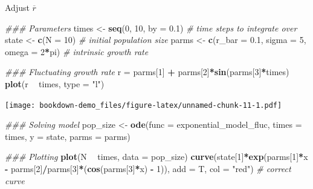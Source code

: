 \documentclass[
]{book}
\newenvironment{Shaded}{\begin{snugshade}}{\end{snugshade}}
\newcommand{\CommentTok}[1]{\textcolor[rgb]{0.56,0.35,0.01}{\textit{#1}}}
\newcommand{\DataTypeTok}[1]{\textcolor[rgb]{0.13,0.29,0.53}{#1}}
\newcommand{\DecValTok}[1]{\textcolor[rgb]{0.00,0.00,0.81}{#1}}
\newcommand{\FloatTok}[1]{\textcolor[rgb]{0.00,0.00,0.81}{#1}}
\newcommand{\KeywordTok}[1]{\textcolor[rgb]{0.13,0.29,0.53}{\textbf{#1}}}
\newcommand{\NormalTok}[1]{#1}
\newcommand{\OperatorTok}[1]{\textcolor[rgb]{0.81,0.36,0.00}{\textbf{#1}}}
\newcommand{\StringTok}[1]{\textcolor[rgb]{0.31,0.60,0.02}{#1}}
\begin{document}
Adjust \(\overline{r}\)

\begin{Shaded}
\begin{Highlighting}[]
\CommentTok{### Parameters}
\NormalTok{times <-}\StringTok{ }\KeywordTok{seq}\NormalTok{(}\DecValTok{0}\NormalTok{, }\DecValTok{10}\NormalTok{, }\DataTypeTok{by =} \FloatTok{0.1}\NormalTok{)  }\CommentTok{# time steps to integrate over}
\NormalTok{state <-}\StringTok{ }\KeywordTok{c}\NormalTok{(}\DataTypeTok{N =} \DecValTok{10}\NormalTok{)  }\CommentTok{# initial population size}
\NormalTok{parms <-}\StringTok{ }\KeywordTok{c}\NormalTok{(}\DataTypeTok{r_bar =} \FloatTok{0.1}\NormalTok{, }\DataTypeTok{sigma =} \DecValTok{5}\NormalTok{, }\DataTypeTok{omega =} \DecValTok{2}\OperatorTok{*}\NormalTok{pi)  }\CommentTok{# intrinsic growth rate}

\CommentTok{### Fluctuating growth rate}
\NormalTok{r =}\StringTok{ }\NormalTok{parms[}\DecValTok{1}\NormalTok{] }\OperatorTok{+}\StringTok{ }\NormalTok{parms[}\DecValTok{2}\NormalTok{]}\OperatorTok{*}\KeywordTok{sin}\NormalTok{(parms[}\DecValTok{3}\NormalTok{]}\OperatorTok{*}\NormalTok{times)}
\KeywordTok{plot}\NormalTok{(r }\OperatorTok{~}\StringTok{ }\NormalTok{times, }\DataTypeTok{type =} \StringTok{"l"}\NormalTok{)}
\end{Highlighting}
\end{Shaded}

\texttt{[image: bookdown-demo\_files/figure-latex/unnamed-chunk-11-1.pdf]}

\begin{Shaded}
\begin{Highlighting}[]
\CommentTok{### Solving model}
\NormalTok{pop_size <-}\StringTok{ }\KeywordTok{ode}\NormalTok{(}\DataTypeTok{func =}\NormalTok{ exponential_model_fluc, }\DataTypeTok{times =}\NormalTok{ times, }\DataTypeTok{y =}\NormalTok{ state, }\DataTypeTok{parms =}\NormalTok{ parms)}

\CommentTok{### Plotting}
\KeywordTok{plot}\NormalTok{(N }\OperatorTok{~}\StringTok{ }\NormalTok{times, }\DataTypeTok{data =}\NormalTok{ pop_size)}
\KeywordTok{curve}\NormalTok{(state[}\DecValTok{1}\NormalTok{]}\OperatorTok{*}\KeywordTok{exp}\NormalTok{(parms[}\DecValTok{1}\NormalTok{]}\OperatorTok{*}\NormalTok{x }\OperatorTok{-}\StringTok{ }\NormalTok{parms[}\DecValTok{2}\NormalTok{]}\OperatorTok{/}\NormalTok{parms[}\DecValTok{3}\NormalTok{]}\OperatorTok{*}\NormalTok{(}\KeywordTok{cos}\NormalTok{(parms[}\DecValTok{3}\NormalTok{]}\OperatorTok{*}\NormalTok{x) }\OperatorTok{-}\StringTok{ }\DecValTok{1}\NormalTok{)), }\DataTypeTok{add =}\NormalTok{ T, }\DataTypeTok{col =} \StringTok{"red"}\NormalTok{) }\CommentTok{# correct curve}
\end{Highlighting}
\end{Shaded}
\end{document}
